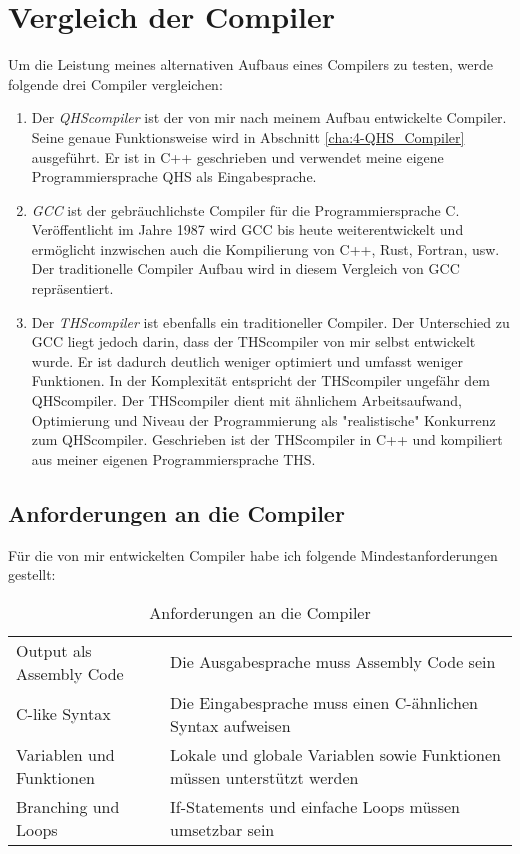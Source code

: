 \chapter{Vergleich der Compiler} \label{cha:2-Vergleich}
Um die Leistung meines alternativen Aufbaus eines Compilers zu testen, werde folgende drei Compiler vergleichen:

\begin{enumerate}
\item
Der \textit{QHScompiler} ist der von mir nach meinem Aufbau entwickelte Compiler. Seine genaue Funktionsweise wird in Abschnitt \ref{cha:4-QHS_Compiler} ausgeführt.
Er ist in C++ geschrieben und verwendet meine eigene Programmiersprache QHS als Eingabesprache. 

\item
\textit{GCC} ist der gebräuchlichste Compiler für die Programmiersprache C. Veröffentlicht im Jahre 1987 wird GCC bis heute weiterentwickelt und ermöglicht inzwischen auch die Kompilierung von C++, Rust, Fortran, usw.
Der traditionelle Compiler Aufbau wird in diesem Vergleich von GCC repräsentiert.

\item
Der \textit{THScompiler} ist ebenfalls ein traditioneller Compiler. Der Unterschied zu GCC liegt jedoch darin, dass der THScompiler von mir selbst entwickelt wurde. 
Er ist dadurch deutlich weniger optimiert und umfasst weniger Funktionen. In der Komplexität entspricht der THScompiler ungefähr dem QHScompiler.
Der THScompiler dient mit ähnlichem Arbeitsaufwand, Optimierung und Niveau der Programmierung als "realistische" Konkurrenz zum QHScompiler.
Geschrieben ist der THScompiler in C++ und kompiliert aus meiner eigenen Programmiersprache THS.
\end{enumerate}

\section{Anforderungen an die Compiler}
Für die von mir entwickelten Compiler habe ich folgende Mindestanforderungen gestellt:

\begin{table}[H]
    \centering
    \caption{Anforderungen an die Compiler}
    \vspace{3mm} %
    
    \begin{tabular}{l|l}
    Output als Assembly Code        & Die Ausgabesprache muss Assembly Code sein                               \\
    C-like Syntax                   & Die Eingabesprache muss einen C-ähnlichen Syntax aufweisen               \\
    Variablen und Funktionen        & Lokale und globale Variablen sowie Funktionen müssen unterstützt werden  \\
    Branching und Loops             & If-Statements und einfache Loops müssen umsetzbar sein
    \end{tabular}
\end{table}


